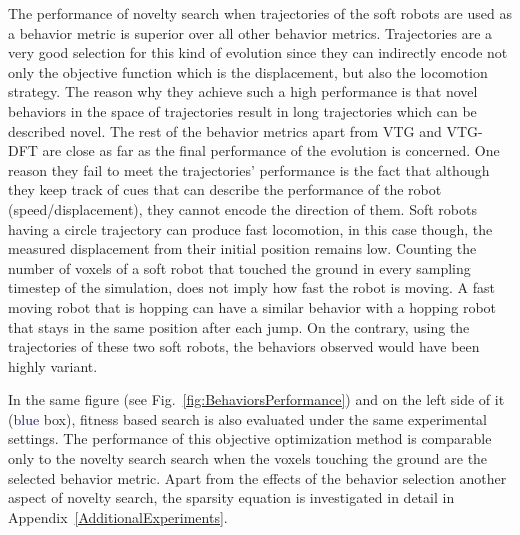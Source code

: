 The performance of novelty search when trajectories of the soft robots are used as a behavior metric is superior over all other behavior metrics. Trajectories are a very good selection for this kind of evolution since they can indirectly  encode not only the objective function which is the displacement, but also the locomotion strategy. The reason why they achieve such a high performance is that novel behaviors in the space of trajectories result in long trajectories which can be described novel. The rest of the behavior metrics apart from VTG and VTG-DFT are close as far as the final performance of the evolution is concerned. One reason they fail to meet the trajectories' performance is the fact that although they keep track of cues that can describe the performance of the robot (speed/displacement), they cannot encode the direction of them. Soft robots having a circle trajectory can produce fast locomotion, in this case though, the measured displacement from their initial position remains low. Counting the number of voxels of a soft robot that touched the ground in every sampling timestep of the simulation, does not imply how fast the robot is moving. A fast moving robot that is hopping can have a similar behavior with a hopping robot that stays in the same position after each jump. On the contrary, using the trajectories of these two soft robots, the behaviors observed would have been highly variant. 

In the same figure (see Fig.~\ref{fig:BehaviorsPerformance}) and on the left side of it (\textcolor{MidnightBlue}{blue} box), fitness based search is also evaluated under the same experimental settings. The performance of this objective optimization method is comparable only to the novelty search search when the voxels touching the ground are the selected behavior metric. Apart from the effects of the behavior selection another aspect of novelty search, the sparsity equation is investigated in detail in Appendix~\ref{AdditionalExperiments}.




